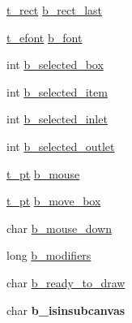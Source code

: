 \begin{DoxyCompactItemize}
\item 
\hyperlink{struct__rect}{t\-\_\-rect} \hyperlink{struct__edspbox_a2a0a15d3bc005cd4f815088b230b5ebd}{b\-\_\-rect\-\_\-last}
\item 
\hyperlink{struct__efont}{t\-\_\-efont} \hyperlink{struct__edspbox_a4071412a20456f5fcafe2a91cdef11c3}{b\-\_\-font}
\item 
int \hyperlink{struct__edspbox_acc1a127070b19ccf6e222d7349c84c96}{b\-\_\-selected\-\_\-box}
\item 
int \hyperlink{struct__edspbox_a1f65b6d093e53fd85bed085ce0c5dd8e}{b\-\_\-selected\-\_\-item}
\item 
int \hyperlink{struct__edspbox_a0cebb4789c213079e0490e86c10c2893}{b\-\_\-selected\-\_\-inlet}
\item 
int \hyperlink{struct__edspbox_acbf0482cb9c6e192e2059775acc1ac86}{b\-\_\-selected\-\_\-outlet}
\item 
\hyperlink{struct__pt}{t\-\_\-pt} \hyperlink{struct__edspbox_a8831d355ec1dbb2dca9a68268a977965}{b\-\_\-mouse}
\item 
\hyperlink{struct__pt}{t\-\_\-pt} \hyperlink{struct__edspbox_a2b028829ae54f8ccede6bb0d5903f7fd}{b\-\_\-move\-\_\-box}
\item 
char \hyperlink{struct__edspbox_a1dc439a4d35e98f78370c81ceadc8ea0}{b\-\_\-mouse\-\_\-down}
\item 
long \hyperlink{struct__edspbox_ad230697acdd2d00abb2dc18dd38089d8}{b\-\_\-modifiers}
\item 
char \hyperlink{struct__edspbox_a234ea03e103bd45f5fa1d27b8e69b5dd}{b\-\_\-ready\-\_\-to\-\_\-draw}
\item 
\hypertarget{struct__edspbox_a4478423a97430b84acbf374f9089f51f}{char {\bfseries b\-\_\-isinsubcanvas}}\label{struct__edspbox_a4478423a97430b84acbf374f9089f51f}


\end{DoxyCompactItemize}
